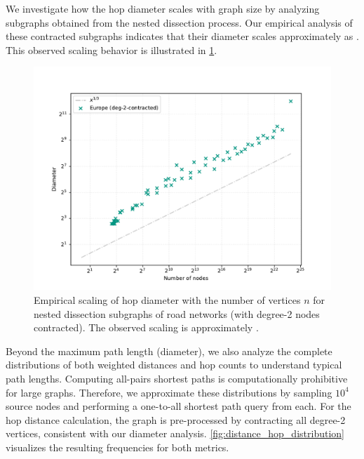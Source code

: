 We investigate how the hop diameter scales with graph size by analyzing subgraphs obtained from the nested dissection process.
Our empirical analysis of these contracted subgraphs indicates that their diameter scales approximately as .
This observed scaling behavior is illustrated in \cref{fig:road_network_diameter_scaling}.

\begin{figure}[tbhp]
    \centering
    \includegraphics[width=0.6\linewidth]{graphics/diam-europe-ifub.pdf}
    \caption{Empirical scaling of hop diameter with the number of vertices \(n\) for nested dissection subgraphs of road networks (with degree-2 nodes contracted). The observed scaling is approximately .}
    \label{fig:road_network_diameter_scaling}
\end{figure}

Beyond the maximum path length (diameter), we also analyze the complete distributions of both weighted distances and hop counts to understand typical path lengths.
Computing all-pairs shortest paths is computationally prohibitive for large graphs.
Therefore, we approximate these distributions by sampling \(10^4\) source nodes and performing a one-to-all shortest path query from each.
For the hop distance calculation, the graph is pre-processed by contracting all degree-2 vertices, consistent with our diameter analysis.
\cref{fig:distance_hop_distribution} visualizes the resulting frequencies for both metrics.

